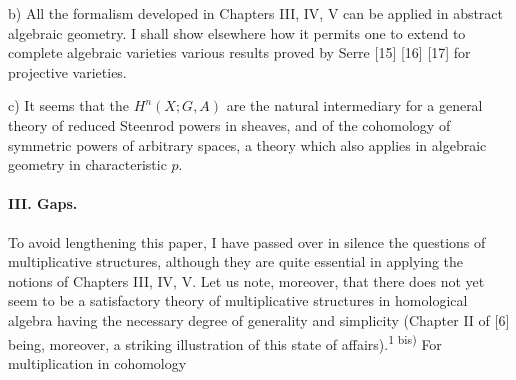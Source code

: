 \par b)
All the formalism developed in Chapters III, IV, V can be applied in abstract
algebraic geometry. I shall show elsewhere how it permits one to extend to
complete algebraic varieties various results proved by Serre [15] [16] [17]
for projective varieties.

\par c)
It seems that the $H^n(X;G,A)$ are the natural intermediary for a general
theory of reduced Steenrod powers in sheaves, and of the cohomology of
symmetric powers of arbitrary spaces, a theory which also applies in
algebraic geometry in characteristic $p$.

\paragraph{III. Gaps.}
To avoid lengthening this paper, I have passed over in silence the questions
of multiplicative structures, although they are quite essential in applying
the notions of Chapters III, IV, V. Let us note, moreover, that there does not
yet seem to be a satisfactory theory of multiplicative structures in
homological algebra having the necessary degree of generality and simplicity
(Chapter II of [6] being, moreover, a striking illustration of this state of
affairs).\textsuperscript{1 bis)} For multiplication in cohomology

